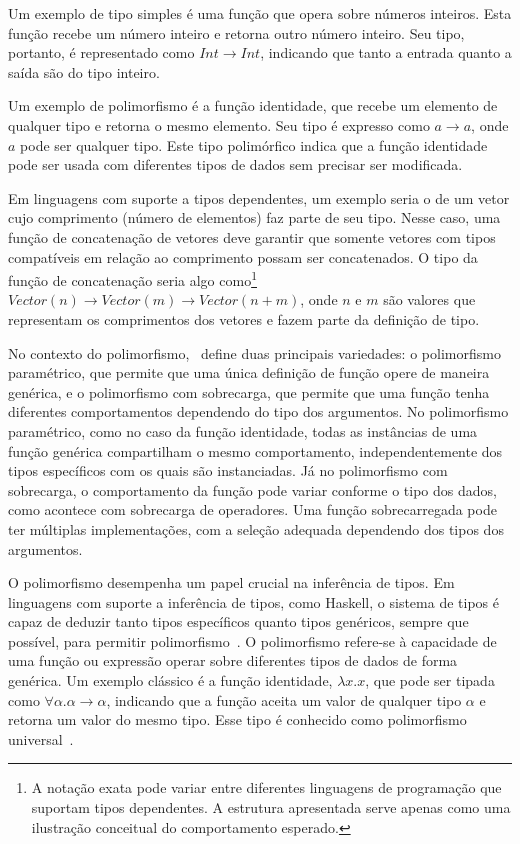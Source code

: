 Um exemplo de tipo simples é uma função que opera sobre números inteiros.
Esta função recebe um número inteiro e retorna outro número inteiro.
Seu tipo, portanto, é representado como $Int \rightarrow Int$, indicando que tanto a entrada quanto a saída são do tipo inteiro.

Um exemplo de polimorfismo é a função identidade, que recebe um elemento de qualquer tipo e retorna o mesmo elemento.
Seu tipo é expresso como $a \rightarrow a$, onde $a$ pode ser qualquer tipo.
Este tipo polimórfico indica que a função identidade pode ser usada com diferentes tipos de dados sem precisar ser modificada.

Em linguagens com suporte a tipos dependentes, um exemplo seria o de um vetor cujo comprimento (número de elementos) faz parte de seu tipo.
Nesse caso, uma função de concatenação de vetores deve garantir que somente vetores com tipos compatíveis em relação ao comprimento possam ser concatenados.
O tipo da função de concatenação seria algo como\footnote{A notação exata pode variar entre diferentes linguagens de programação que suportam tipos dependentes. A estrutura apresentada serve apenas como uma ilustração conceitual do comportamento esperado.} $Vector(n) \rightarrow Vector(m) \rightarrow Vector(n+m)$, onde $n$ e $m$ são valores que representam os comprimentos dos vetores e fazem parte da definição de tipo.

No contexto do polimorfismo,~ define duas principais variedades: o polimorfismo paramétrico, que permite que uma única definição de função opere de maneira genérica, e o polimorfismo com sobrecarga, que permite que uma função tenha diferentes comportamentos dependendo do tipo dos argumentos.
No polimorfismo paramétrico, como no caso da função identidade, todas as instâncias de uma função genérica compartilham o mesmo comportamento, independentemente dos tipos específicos com os quais são instanciadas.
Já no polimorfismo com sobrecarga, o comportamento da função pode variar conforme o tipo dos dados, como acontece com sobrecarga de operadores. Uma função sobrecarregada pode ter múltiplas implementações, com a seleção adequada dependendo dos tipos dos argumentos.

O polimorfismo desempenha um papel crucial na inferência de tipos.
Em linguagens com suporte a inferência de tipos, como Haskell, o sistema de tipos é capaz de deduzir tanto tipos específicos quanto tipos genéricos, sempre que possível, para permitir polimorfismo~\cite{pierce2002types}.
O polimorfismo refere-se à capacidade de uma função ou expressão operar sobre diferentes tipos de dados de forma genérica.
Um exemplo clássico é a função identidade, $\lambda x.x$, que pode ser tipada como $\forall \alpha. \alpha \to \alpha$, indicando que a função aceita um valor de qualquer tipo $\alpha$ e retorna um valor do mesmo tipo.
Esse tipo é conhecido como polimorfismo universal~\cite{pierce2002types}.

